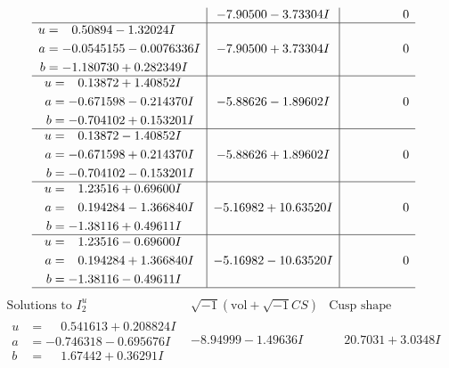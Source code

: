 \documentclass[1p]{elsarticle_modified}
\theoremstyle{definition}
\newcommand{\I}{\sqrt{-1}}
\begin{document}
$$\begin{array}{c|c|c}
 & -7.90500 - 3.73304 I & \phantom{-0.000000 } 0 \\ \hline\begin{aligned}
u &= \phantom{-}0.50894 - 1.32024 I \\
a &= -0.0545155 - 0.0076336 I \\
b &= -1.180730 + 0.282349 I\end{aligned}
 & -7.90500 + 3.73304 I & \phantom{-0.000000 } 0 \\ \hline\begin{aligned}
u &= \phantom{-}0.13872 + 1.40852 I \\
a &= -0.671598 - 0.214370 I \\
b &= -0.704102 + 0.153201 I\end{aligned}
 & -5.88626 - 1.89602 I & \phantom{-0.000000 } 0 \\ \hline\begin{aligned}
u &= \phantom{-}0.13872 - 1.40852 I \\
a &= -0.671598 + 0.214370 I \\
b &= -0.704102 - 0.153201 I\end{aligned}
 & -5.88626 + 1.89602 I & \phantom{-0.000000 } 0 \\ \hline\begin{aligned}
u &= \phantom{-}1.23516 + 0.69600 I \\
a &= \phantom{-}0.194284 - 1.366840 I \\
b &= -1.38116 + 0.49611 I\end{aligned}
 & -5.16982 + 10.63520 I & \phantom{-0.000000 } 0 \\ \hline\begin{aligned}
u &= \phantom{-}1.23516 - 0.69600 I \\
a &= \phantom{-}0.194284 + 1.366840 I \\
b &= -1.38116 - 0.49611 I\end{aligned}
 & -5.16982 - 10.63520 I & \phantom{-0.000000 } 0\\
 \hline 
 \end{array}$$\newpage$$\begin{array}{c|c|c}  
\text{Solutions to }I^u_{2}& \I (\text{vol} + \sqrt{-1}CS) & \text{Cusp shape}\\
 \hline 
\begin{aligned}
u &= \phantom{-}0.541613 + 0.208824 I \\
a &= -0.746318 - 0.695676 I \\
b &= \phantom{-}1.67442 + 0.36291 I\end{aligned}
 & -8.94999 - 1.49636 I & \phantom{-}20.7031 + 3.0348 I \\ \hline\begin{aligned}

\end{aligned}
\end{array}$$
\end{document}
